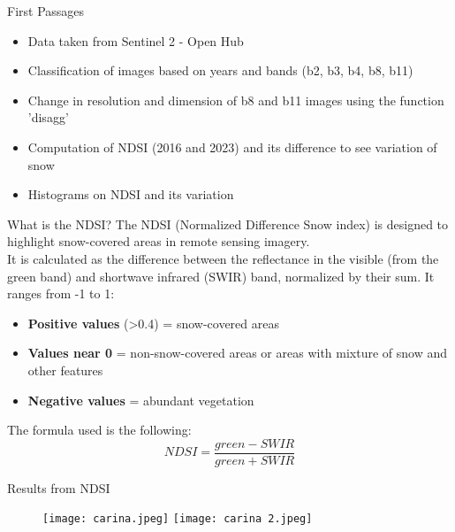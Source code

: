 \documentclass{beamer}
\begin{document}
\begin{frame}{First Passages}
    \begin{itemize}
        \item Data taken from Sentinel 2 - Open Hub
        \item Classification of images based on years and bands (b2, b3, b4, b8, b11)
        \item Change in resolution and dimension of b8 and b11 images using the function 'disagg'
        \item Computation of NDSI (2016 and 2023) and its difference to see variation of snow
        \item Histograms on NDSI and its variation
        
      
    \end{itemize}
\end{frame}


\begin{frame}{What is the NDSI?}
The NDSI (Normalized Difference Snow index) is designed to highlight snow-covered areas in remote sensing imagery. \\
It is calculated as the difference between the reflectance in the visible (from the green band) and shortwave infrared (SWIR) band, normalized by their sum.
It ranges from -1 to 1:  
\begin{itemize}
    \item \textbf{Positive values} (\textgreater 0.4) = snow-covered areas
    \item \textbf{Values near 0} = non-snow-covered areas or areas with mixture of snow and other features
    \item \textbf{Negative values} = abundant vegetation
\end{itemize}

The formula used is the following:\\
         \begin{equation}
         NDSI = \frac{green - SWIR}{green + SWIR}
           \end{equation}
     
\end{frame}

\begin{frame}{Results from NDSI}
    
\begin{figure}[]
    \texttt{[image: carina.jpeg]}
    \texttt{[image: carina 2.jpeg]}
\end{figure}

\end{frame}
\end{document}
